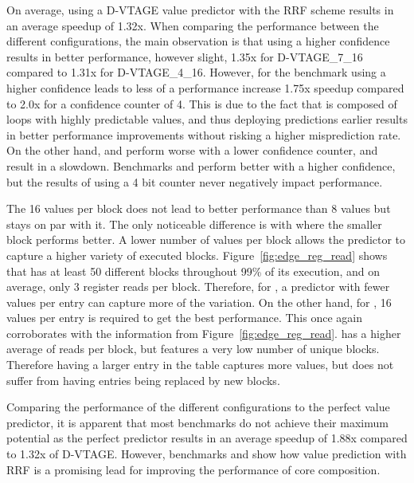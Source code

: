 On average, using a D-VTAGE value predictor with the RRF scheme results in an average speedup of 1.32x.
When comparing the performance between the different configurations, the main observation is that using a higher confidence results in better performance, however slight, 1.35x for D-VTAGE\_7\_16 compared to 1.31x for D-VTAGE\_4\_16.
However, for the benchmark  using a higher confidence leads to less of a performance increase 1.75x speedup compared to 2.0x for a confidence counter of 4.
This is due to the fact that  is composed of loops with highly predictable values, and thus deploying predictions earlier results in better performance improvements without risking a higher misprediction rate.
On the other hand,  and  perform worse with a lower confidence counter, and result in a slowdown.
Benchmarks  and  perform better with a higher confidence, but the results of using a 4 bit counter never negatively impact performance.

The 16 values per block does not lead to better performance than 8 values but stays on par with it.
The only noticeable difference is with  where the smaller block performs better.
A lower number of values per block allows the predictor to capture a higher variety of executed blocks.
Figure~\ref{fig:edge_reg_read} shows that  has at least 50 different blocks throughout 99\% of its execution, and on average, only 3 register reads per block.
Therefore, for , a predictor with fewer values per entry can capture more of the variation.
On the other hand, for , 16 values per entry is required to get the best performance.
This once again corroborates with the information from Figure~\ref{fig:edge_reg_read}.
 has a higher average of reads per block, but features a very low number of unique blocks.
Therefore having a larger entry in the table captures more values, but does not suffer from having entries being replaced by new blocks.

Comparing the performance of the different configurations to the perfect value predictor, it is apparent that most benchmarks do not achieve their maximum potential as the perfect predictor results in an average speedup of 1.88x compared to 1.32x of D-VTAGE.
However, benchmarks  and  show how value prediction with RRF is a promising lead for improving the performance of core composition.

